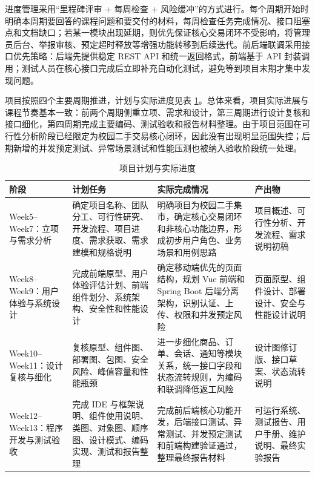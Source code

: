 ﻿\documentclass[UTF8,a4paper,12pt]{ctexart}
\begin{document}
进度管理采用“里程碑评审 + 每周检查 + 风险缓冲”的方式进行。每个周期开始时明确本周期要回答的课程问题和要交付的材料，每周检查任务完成情况、接口阻塞点和文档缺口；若某一模块出现延期，则优先保证核心交易闭环不受影响，将管理员后台、举报审核、预定超时释放等增强功能转移到后续迭代。前后端联调采用接口优先策略：后端先提供稳定 REST API 和统一返回格式，前端基于 API 封装调用；测试人员在核心接口完成后立即补充自动化测试，避免等到项目末期才集中发现问题。

项目按照四个主要周期推进，计划与实际进度见表 \ref{tab:project-schedule}。总体来看，项目实际进展与课程节奏基本一致：前两个周期侧重立项、需求和设计，第三周期进行设计复核和接口细化，第四周期完成主要编码、测试验收和报告材料整理。由于项目范围在可行性分析阶段已经限定为校园二手交易核心闭环，因此没有出现明显范围失控；后期新增的并发预定测试、异常场景测试和性能压测也被纳入验收阶段统一处理。

\begin{table}[H]
  \centering
  \caption{项目计划与实际进度}
  \label{tab:project-schedule}
  \begin{tabular}{p{2.7cm}p{4.2cm}p{4.2cm}p{3.2cm}}
    \toprule
    阶段 & 计划任务 & 实际完成情况 & 产出物 \\
    \midrule
    Week5--Week7：立项与需求分析 & 确定项目名称、团队分工、可行性研究、开发流程、项目进度、需求获取、需求建模和规格说明 & 明确项目为校园二手集市，确定核心交易闭环和非核心功能边界，形成初步用户角色、业务场景和用例思路 & 项目概述、可行性分析、开发流程、需求说明初稿 \\
    Week8--Week9：用户体验与系统设计 & 完成前端原型、用户体验评估计划、前端组件划分、系统架构、安全性和性能设计 & 确定移动端优先的页面结构，规划 Vue 前端和 Spring Boot 后端分离架构，识别认证、上传、权限和并发预定风险 & 页面原型、组件设计、部署设计、安全与性能设计说明 \\
    Week10--Week11：设计复核与细化 & 复核原型、组件图、部署图、包图、安全风险、峰值容量和性能瓶颈 & 进一步细化商品、订单、会话、通知等模块关系，统一接口字段和状态流转规则，为编码和联调降低返工风险 & 设计图修订版、接口草案、状态流转说明 \\
    Week12--Week13：程序开发与测试验收 & 完成 IDE 与框架说明、组件使用说明、类图、对象图、顺序图、设计模式、编码实现、测试和报告整理 & 完成前后端核心功能开发，后端接口测试、异常测试、并发预定测试和前端构建验证通过，整理最终报告材料 & 可运行系统、测试报告、用户手册、维护说明、最终实验报告 \\
    \bottomrule
  \end{tabular}
\end{table}
\end{document}

